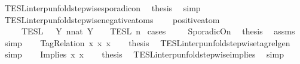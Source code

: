 \begin{isabellebody}
\ TESL{\isacharunderscore}interp{\isacharunderscore}unfold{\isacharunderscore}stepwise{\isacharunderscore}sporadicon\ \isamarkupfalse%
\ {\isacharquery}thesis\ \isamarkupfalse%
\ simp\isanewline
{}\isamarkupfalse%
%
\endisatagproof
{\isafoldproof}%
%
\isadelimproof
\isanewline
%
\endisadelimproof
\isanewline
{}\isamarkupfalse%
\ TESL{\isacharunderscore}interp{\isacharunderscore}unfold{\isacharunderscore}stepwise{\isacharunderscore}negative{\isacharunderscore}atoms{\isacharcolon}\isanewline
\ \ \ {\isacartoucheopen}{\isasymnot}\ positive{\isacharunderscore}atom\ {\isasymphi}{\isacartoucheclose}\isanewline
\ \ \ {\isacartoucheopen}{\isasymlbrakk}\ {\isasymphi}\ {\isasymrbrakk}\isactrlsub T\isactrlsub E\isactrlsub S\isactrlsub L\ {\isacharequal}\ {\isasymInter}\ {\isacharbraceleft}Y{\isachardot}\ {\isasymexists}n{\isacharcolon}{\isacharcolon}nat{\isachardot}\ Y\ {\isacharequal}\ {\isasymlbrakk}\ {\isasymphi}\ {\isasymrbrakk}\isactrlsub T\isactrlsub E\isactrlsub S\isactrlsub L\isactrlbsup {\isasymge}\ n\isactrlesup {\isacharbraceright}{\isacartoucheclose}\isanewline
%
\isadelimproof
%
\endisadelimproof
%
\isatagproof
{}\isamarkupfalse%
\ {\isacharparenleft}cases\ {\isasymphi}{\isacharparenright}\isanewline
\ \ \isamarkupfalse%
\ SporadicOn\ \isamarkupfalse%
\ {\isacharquery}thesis\ \isamarkupfalse%
\ assms\ \isamarkupfalse%
\ simp\isanewline
{}\isamarkupfalse%
\isanewline
\ \ \isamarkupfalse%
\ {\isacharparenleft}TagRelation\ x{}{}\ x{}{}\ x{}{}{\isacharparenright}\isanewline
\ \ \isamarkupfalse%
\ {\isacharquery}thesis\ \isamarkupfalse%
\ TESL{\isacharunderscore}interp{\isacharunderscore}unfold{\isacharunderscore}stepwise{\isacharunderscore}tagrelgen\ \isamarkupfalse%
\ simp\isanewline
{}\isamarkupfalse%
\isanewline
\ \ \isamarkupfalse%
\ {\isacharparenleft}Implies\ x{}{}\ x{}{}{\isacharparenright}\isanewline
\ \ \isamarkupfalse%
\ {\isacharquery}thesis\ \isamarkupfalse%
\ TESL{\isacharunderscore}interp{\isacharunderscore}unfold{\isacharunderscore}stepwise{\isacharunderscore}implies\ \isamarkupfalse%
\ simp\isanewline
{}\isamarkupfalse%
\isanewline
\ \ \isamarkupfalse%

\end{isabellebody}
